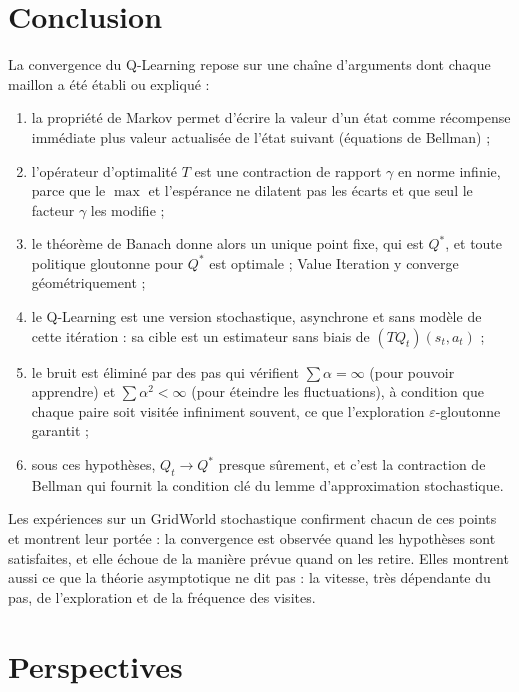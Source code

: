 \section{Conclusion}

La convergence du Q-Learning repose sur une chaîne d'arguments dont chaque maillon a été établi ou expliqué :
\begin{enumerate}
\item la propriété de Markov permet d'écrire la valeur d'un état comme récompense immédiate plus valeur actualisée de l'état suivant (équations de Bellman) ;
\item l'opérateur d'optimalité $T$ est une contraction de rapport $\gamma$ en norme infinie, parce que le $\max$ et l'espérance ne dilatent pas les écarts et que seul le facteur $\gamma$ les modifie ;
\item le théorème de Banach donne alors un unique point fixe, qui est $Q^*$, et toute politique gloutonne pour $Q^*$ est optimale ; Value Iteration y converge géométriquement ;
\item le Q-Learning est une version stochastique, asynchrone et sans modèle de cette itération : sa cible est un estimateur sans biais de $(TQ_t)(s_t,a_t)$ ;
\item le bruit est éliminé par des pas qui vérifient $\sum\alpha=\infty$ (pour pouvoir apprendre) et $\sum\alpha^2<\infty$ (pour éteindre les fluctuations), à condition que chaque paire soit visitée infiniment souvent, ce que l'exploration $\varepsilon$-gloutonne garantit ;
\item sous ces hypothèses, $Q_t\to Q^*$ presque sûrement, et c'est la contraction de Bellman qui fournit la condition clé du lemme d'approximation stochastique.
\end{enumerate}
Les expériences sur un GridWorld stochastique confirment chacun de ces points et montrent leur portée : la convergence est observée quand les hypothèses sont satisfaites, et elle échoue de la manière prévue quand on les retire. Elles montrent aussi ce que la théorie asymptotique ne dit pas : la vitesse, très dépendante du pas, de l'exploration et de la fréquence des visites.

\section{Perspectives}\label{sec-perspectives}

